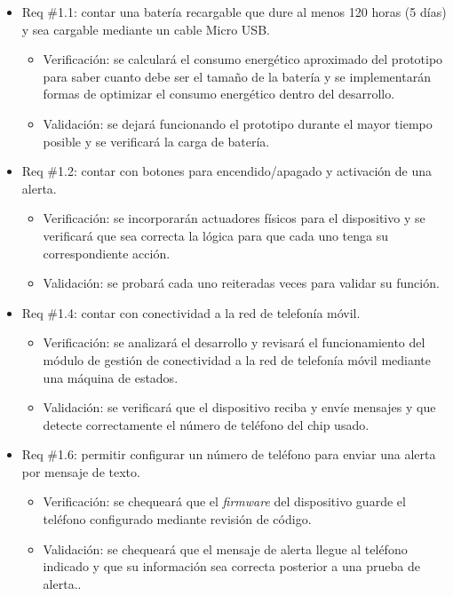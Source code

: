 \documentclass[
11pt, %
]{charter}
\begin{document}
\begin{itemize} 
\item Req \#1.1: contar una batería recargable que dure al menos 120 horas (5 días) y sea cargable mediante un cable Micro USB.

\begin{itemize}
	\item Verificación: se calculará el consumo energético aproximado del prototipo para saber cuanto debe ser el tamaño de la batería y se implementarán formas de optimizar el consumo energético dentro del desarrollo.
	\item Validación: se dejará funcionando el prototipo durante el mayor tiempo posible y se verificará la carga de batería.
\end{itemize}

\item Req \#1.2: contar con botones para encendido/apagado y activación de una alerta.

\begin{itemize}
	\item Verificación: se incorporarán actuadores físicos para el dispositivo y se verificará que sea correcta la lógica para que cada uno tenga su correspondiente acción.
	\item Validación: se probará cada uno reiteradas veces para validar su función.
\end{itemize}

\item Req \#1.4: contar con conectividad a la red de telefonía móvil.

\begin{itemize}
	\item Verificación: se analizará el desarrollo y revisará el funcionamiento del módulo de gestión de conectividad a la red de telefonía móvil mediante una máquina de estados.
	\item Validación: se verificará que el dispositivo reciba y envíe mensajes y que detecte correctamente el número de teléfono del chip usado.
\end{itemize}

\item Req \#1.6: permitir configurar un número de teléfono para enviar una alerta por mensaje de texto.

\begin{itemize}
	\item Verificación: se chequeará que el \textit{firmware} del dispositivo guarde el teléfono configurado mediante revisión de código.
	\item Validación: se chequeará que el mensaje de alerta llegue al teléfono indicado y que su información sea correcta posterior a una prueba de alerta..
\end{itemize}


\end{itemize}
\end{document}
